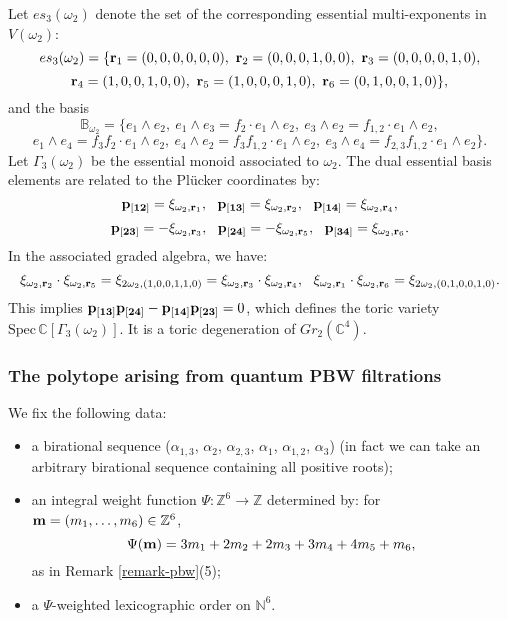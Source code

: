 \documentclass{emsprocart}
\theoremstyle{definition}
\begin{document}
Let $es_3(\omega_2)$ denote the set of the corresponding essential multi-exponents in $V(\omega_2)$:
$$es_3(\omega_2)=\{\bold{r}_1=(0,0,0,0,0,0),\ \bold{r}_2=(0,0,0,1,0,0),\ \bold{r}_3=(0,0,0,0,1,0),$$ $$\bold{r}_4=(1,0,0,1,0,0),\ \bold{r}_5=(1,0,0,0,1,0),\ \bold{r}_6=(0,1,0,0,1,0)\},$$
and the basis
$$\mathbb{B}_{\omega_2}=\{e_1\wedge e_2,\ e_1\wedge e_3=f_2\cdot e_1\wedge e_2,\ e_3\wedge e_2=f_{1,2}\cdot e_1\wedge e_2,$$
$$e_1\wedge e_4=f_3f_2\cdot e_1\wedge e_2,\ e_4\wedge e_2=f_3f_{1,2}\cdot e_1\wedge e_2,\ e_3\wedge e_4=f_{2,3}f_{1,2}\cdot e_1\wedge e_2\}.$$
Let $\Gamma_3(\omega_2)$ be the essential monoid associated to $\omega_2$. The dual essential basis elements are related to the Pl\"ucker coordinates by:
$$\bold{p_{[12]}}=\xi_{\omega_2,\bold{r}_1},\ \ \bold{p_{[13]}}=\xi_{\omega_2,\bold{r}_2},\ \ \bold{p_{[14]}}=\xi_{\omega_2,\bold{r}_4},$$
$$\bold{p_{[23]}}=-\xi_{\omega_2,\bold{r}_3},\ \ \bold{p_{[24]}}=-\xi_{\omega_2,\bold{r}_5},\ \ \bold{p_{[34]}}=\xi_{\omega_2,\bold{r}_6}.$$
In the associated graded algebra, we have:
$$\xi_{\omega_2,\bold{r}_2}\cdot \xi_{\omega_2,\bold{r}_5}=\xi_{2\omega_2,(1,0,0,1,1,0)}=\xi_{\omega_2,\bold{r}_3}\cdot \xi_{\omega_2,\bold{r}_4},\ \  \xi_{\omega_2,\bold{r}_1}\cdot \xi_{\omega_2,\bold{r}_6}=\xi_{2\omega_2,(0,1,0,0,1,0)}.$$
This implies $\bold{p_{[13]}}\bold{p_{[24]}}-\bold{p_{[14]}}\bold{p_{[23]}}=0$, which defines the toric variety $\textrm{Spec}\,\mathbb{C}[\Gamma_3(\omega_2)]$. It is a toric degeneration of $Gr_{2}(\mathbb C^4)$.



\subsubsection{The polytope arising from quantum PBW filtrations}
We fix the following data:
\begin{itemize}
\item a birational sequence ($\alpha_{1,3}$, $\alpha_2$, $\alpha_{2,3}$, $\alpha_1$, $\alpha_{1,2}$, $\alpha_3$) (in fact we can take an arbitrary birational sequence containing all positive roots);
\item an integral weight function $\Psi:\mathbb{Z}^6\rightarrow\mathbb{Z}$ determined by: for $\bold{m}=(m_1,\ldots,m_6)\in\mathbb{Z}^6$,
$$\Psi(\bold{m})=3m_1+2m_2+2m_3+3m_4+4m_5+m_6,$$
as in Remark \ref{remark-pbw}(5);
\item a $\Psi$-weighted lexicographic order on $\mathbb{N}^6$.
\end{itemize}
\end{document}
